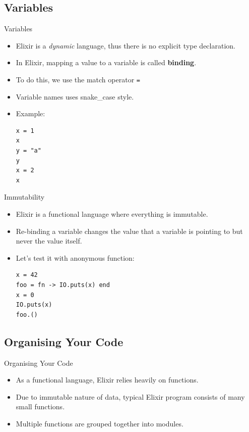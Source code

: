 \documentclass[12pt]{beamer}
\begin{document}
\subsection{Variables}
\begin{frame}[fragile]{Variables}
  \begin{itemize}
    \item Elixir is a \textit{dynamic} language, thus there is no explicit type declaration.
    \item In Elixir, mapping a value to a variable is called \textbf{binding}.
    \item To do this, we use the match operator \texttt{=}
    \item Variable names uses snake\_case style.
    \item Example:
          \begin{verbatim}
x = 1
x
y = "a"
y
x = 2
x
  \end{verbatim}
  \end{itemize}
\end{frame}

\begin{frame}[fragile]{Immutability}
  \begin{itemize}
    \item Elixir is a functional language where everything is immutable.
    \item Re-binding a variable changes the value that a variable is pointing to but never the value itself.
    \item Let's test it with anonymous function:
          \begin{verbatim}
x = 42
foo = fn -> IO.puts(x) end
x = 0
IO.puts(x)
foo.()
        \end{verbatim}
  \end{itemize}
\end{frame}

\subsection{Organising Your Code}
\begin{frame}{Organising Your Code}
  \begin{itemize}
    \item As a functional language, Elixir relies heavily on functions.
    \item Due to immutable nature of data, typical Elixir program consists of many small functions.
    \item Multiple functions are grouped together into modules.
  \end{itemize}
\end{frame}
\end{document}
